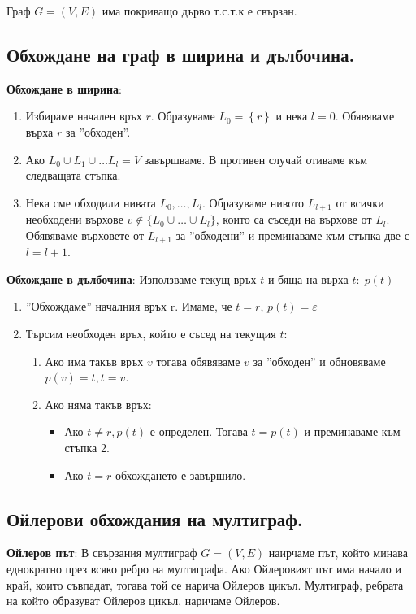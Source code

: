 \documentclass{article}
\renewcommand{\\}{\newline}
\begin{document}
      Граф \(G = (V, E)\) има покриващо дърво т.с.т.к е свързан. 

      \subsection{Обхождане на граф в ширина и дълбочина.} 
      \textbf{Обхождане в ширина}: 
      \begin{enumerate}
          \item Избираме начален връх \(r\). Образуваме \(L_{0} = \left\{r\right\}\) и нека \(l = 0\). Обявяваме върха \(r\) за ''обходен''. 
          \item Ако \(L_{0} \cup L_{1} \cup \dots L_{l} = V\) завършваме. В противен случай отиваме към следващата стъпка. 
          \item Нека сме обходили нивата \(L_{0},\dots, L_{l}\). Образуваме нивото \(L_{l+1}\) от всички необходени върхове \(v \not\in \{L_{0} \cup \dots \cup L_{l}\}\), които са съседи на върхове от \(L_{l}\). Обявяваме върховете от \(L_{l+1}\) за ''обходени'' и преминаваме към стъпка две с \(l = l+1\).      
      \end{enumerate}

      \textbf{Обхождане в дълбочина}: Използваме текущ връх \(t\) и бяща на върха \(t:\; p(t)\)   
      \begin{enumerate}
          \item ''Обхождаме'' началния връх r. Имаме, че \(t = r\), \(p(t) = \varepsilon\)
          \item Търсим необходен връх, който е съсед на текущия \(t\):
            \begin{enumerate}
                \item Ако има такъв връх \(v\) тогава обявяваме \(v\) за ''обходен'' и обновяваме \(p(v) = t, t = v\). 
                \item Ако няма такъв връх:
                  \begin{itemize}
                      \item Ако \(t \not= r, p(t)\)  е определен. Тогава \(t = p(t)\) и преминаваме към стъпка 2. 
                      \item Ако \(t = r\) обхождането е завършило. 
                  \end{itemize}
            \end{enumerate}
      \end{enumerate}

      \subsection{Ойлерови обхождания на мултиграф.} 
      \textbf{Ойлеров път}: В свързания мултиграф \(G = (V, E)\) наирчаме път, който минава еднократно през всяко ребро на мултиграфа. Ако Ойлеровият път има начало и край, които съвпадат, тогава той се нарича Ойлеров цикъл. Мултиграф, ребрата на който образуват Ойлеров цикъл, наричаме Ойлеров. 
\end{document}
